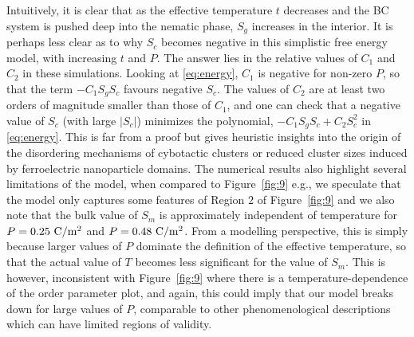 \documentclass[reprint,amsfonts,amsmath,amssymb,aps,pre,floatfix,10pt]{revtex4-1}
\begin{document}
 Intuitively, it is clear that as the effective temperature $t$ decreases and the BC system is pushed deep into the nematic phase, $S_g$ increases in the interior. It is perhaps less clear as to why $S_c$ becomes negative in this simplistic free energy model, with increasing $t$ and $P$. The answer lies in the relative values of $C_1$ and $C_2$ in these simulations. Looking at \eqref{eq:energy}, $C_1$ is negative for non-zero $P$, so that the term $- C_1 S_g S_c$ favours negative $S_c$. The values of $C_2$ are at least two orders of magnitude smaller than those of $C_1$, and one can check that a negative value of $S_c$ (with large $|S_c|$) minimizes the polynomial, $- C_1 S_g S_c + C_2 S_c^2$ in \eqref{eq:energy}. This is far from a proof but gives heuristic insights into the origin of the disordering mechanisms of cybotactic clusters or reduced cluster sizes induced by ferroelectric nanoparticle domains. The numerical results also highlight several limitations of the model, when compared to Figure~\ref{fig:9} e.g., we speculate that the model only captures some features of Region $2$ of Figure~\ref{fig:9} and we also note that the bulk value of $S_m$ is approximately independent of temperature for $P = 0.25 ~\rm{C}/\rm{m}^2$ and $P = 0.48 ~\rm{C}/\rm{m}^2$. From a modelling perspective, this is simply because larger values of $P$ dominate the definition of the effective temperature, so that the actual value of $T$ becomes less significant for the value of $S_m$. This is however, inconsistent with Figure~\ref{fig:9} where there is a temperature-dependence of the order parameter plot, and again, this could imply that our model breaks down for large values of $P$, comparable to other phenomenological descriptions which can have limited regions of validity.

\end{document}
